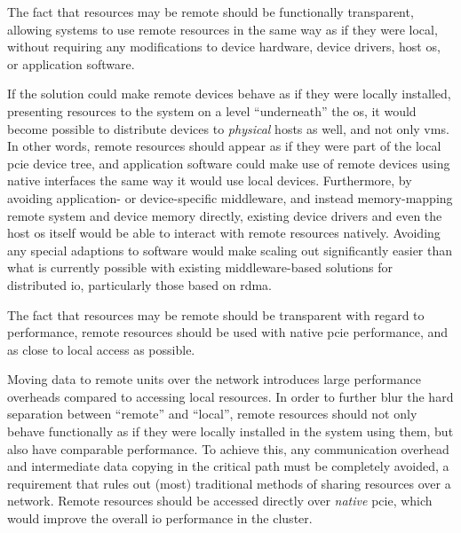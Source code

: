 \begin{objective}\label{obj:transparent}
    The fact that resources may be remote should be functionally transparent, allowing systems to use remote resources in the same way as if they were local, without requiring any modifications to device hardware, device drivers, host \gls{os}, or application software.
\end{objective}
If the solution could make remote devices behave as if they were locally installed, presenting resources to the system on a level ``underneath'' the \gls{os}, it would become possible to distribute devices to \emph{physical} hosts as well, and not only \glspl{vm}. 
In other words, remote resources should appear as if they were part of the local \gls{pcie} device tree, and application software could make use of remote devices using native interfaces the same way it would use local devices.
%
Furthermore, by avoiding application- or device-specific \gls{middleware}, and instead memory-mapping remote system and device memory directly, existing device drivers and even the host \gls{os} itself would be able to interact with remote resources natively.
Avoiding any special adaptions to software would make scaling out significantly easier than what is currently possible with existing \gls{middleware}-based solutions for distributed \gls{io}, particularly those based on \gls{rdma}.



\begin{objective}\label{obj:performance}
    The fact that resources may be remote should be transparent with regard to performance, remote resources should be used with native \gls{pcie} performance, and as close to local access as possible.
\end{objective}
Moving data to remote units over the network introduces large performance overheads compared to accessing local resources. 
In order to further blur the hard separation between ``remote'' and ``local'', remote resources should not only behave functionally as if they were locally installed in the system using them, but also have comparable performance.
To achieve this, any communication overhead and intermediate data copying in the critical path must be completely avoided, a requirement that rules out (most) traditional methods of sharing resources over a network. 
Remote resources should be accessed directly over \emph{native} \gls{pcie}, which would improve the overall \gls{io} performance in the cluster.



